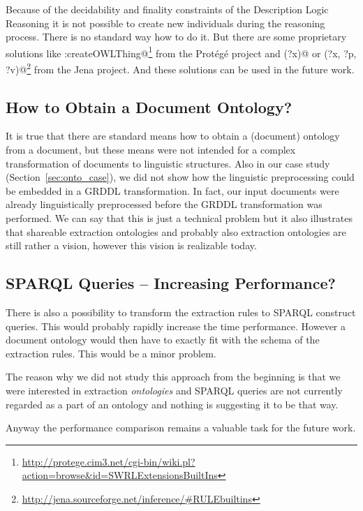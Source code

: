 Because of the decidability and finality constraints of the Description Logic Reasoning it is not possible to create new individuals during the reasoning process. There is no standard way how to do it. But there are some proprietary solutions like \verb@swrlx:createOWLThing@\footnote{\url{http://protege.cim3.net/cgi-bin/wiki.pl?action=browse&id=SWRLExtensionsBuiltIns}} from the Prot\'{e}g\'{e} project and \verb@makeTemp(?x)@ or \verb@makeInstance(?x, ?p, ?v)@\footnote{\url{http://jena.sourceforge.net/inference/#RULEbuiltins}} from the Jena project.
And these solutions can be used in the future work. 

\subsection{How to Obtain a Document Ontology?}

It is true that there are standard means how to obtain a (document) ontology from a document, but these means were not intended for a complex transformation of documents to linguistic structures. Also in our case study (Section~\ref{sec:onto_case}), we did not show how the linguistic preprocessing could be embedded in a GRDDL transformation. In fact, our input documents were already linguistically preprocessed before the GRDDL transformation was performed. We can say that this is just a technical problem but it also illustrates that shareable extraction ontologies and probably also extraction ontologies are still rather a vision, however this vision is realizable today.

\subsection{SPARQL Queries -- Increasing Performance?}

There is also a possibility to transform the extraction rules to SPARQL construct queries. This would probably rapidly increase the time performance. However a document ontology would then have to exactly fit with the schema of the extraction rules.  This would be a minor problem. 

The reason why we did not study this approach from the beginning is that we were interested in extraction \emph{ontologies} and SPARQL queries are not currently regarded as a part of an ontology and nothing is suggesting it to be that way.  

Anyway the performance comparison remains a valuable task for the future work.

